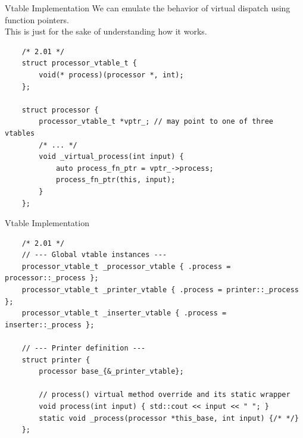 \begin{frame}[fragile]{Vtable Implementation}
  We can emulate the behavior of virtual dispatch using function pointers. \\
  This is just for the sake of understanding how it works.

  \begin{verbatim}
    /* 2.01 */
    struct processor_vtable_t {
        void(* process)(processor *, int);
    };

    struct processor {
        processor_vtable_t *vptr_; // may point to one of three vtables
        /* ... */
        void _virtual_process(int input) {
            auto process_fn_ptr = vptr_->process;
            process_fn_ptr(this, input);
        }
    };
  \end{verbatim}
\end{frame}

\begin{frame}[fragile]{Vtable Implementation}
  \begin{verbatim}
    /* 2.01 */
    // --- Global vtable instances ---
    processor_vtable_t _processor_vtable { .process = processor::_process };
    processor_vtable_t _printer_vtable { .process = printer::_process };
    processor_vtable_t _inserter_vtable { .process = inserter::_process };

    // --- Printer definition ---
    struct printer {
        processor base_{&_printer_vtable};

        // process() virtual method override and its static wrapper
        void process(int input) { std::cout << input << " "; }
        static void _process(processor *this_base, int input) {/* */}
    };
  \end{verbatim}
\end{frame}
